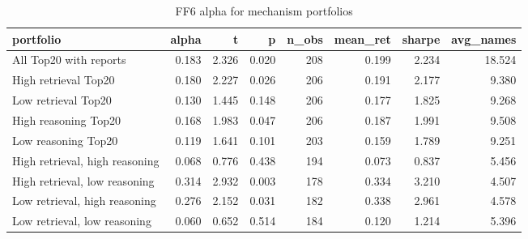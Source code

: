 \begin{table}[!htbp]\centering
\caption{FF6 alpha for mechanism portfolios}
\label{tab:portfolio_alpha}
\begin{tabular}{lrrrrrrr}
\toprule
portfolio & alpha & t & p & n\_obs & mean\_ret & sharpe & avg\_names \\
\midrule
All Top20 with reports & 0.183 & 2.326 & 0.020 & 208 & 0.199 & 2.234 & 18.524 \\
High retrieval Top20 & 0.180 & 2.227 & 0.026 & 206 & 0.191 & 2.177 & 9.380 \\
Low retrieval Top20 & 0.130 & 1.445 & 0.148 & 206 & 0.177 & 1.825 & 9.268 \\
High reasoning Top20 & 0.168 & 1.983 & 0.047 & 206 & 0.187 & 1.991 & 9.508 \\
Low reasoning Top20 & 0.119 & 1.641 & 0.101 & 203 & 0.159 & 1.789 & 9.251 \\
High retrieval, high reasoning & 0.068 & 0.776 & 0.438 & 194 & 0.073 & 0.837 & 5.456 \\
High retrieval, low reasoning & 0.314 & 2.932 & 0.003 & 178 & 0.334 & 3.210 & 4.507 \\
Low retrieval, high reasoning & 0.276 & 2.152 & 0.031 & 182 & 0.338 & 2.961 & 4.578 \\
Low retrieval, low reasoning & 0.060 & 0.652 & 0.514 & 184 & 0.120 & 1.214 & 5.396 \\
\bottomrule
\end{tabular}
\end{table}
